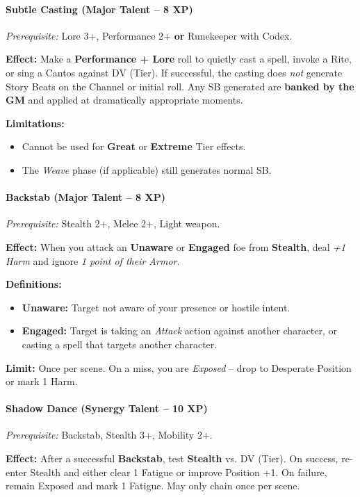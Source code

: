 \paragraph{Subtle Casting (Major Talent -- 8 XP)}
\textit{Prerequisite:} Lore 3+, Performance 2+ \textbf{or} Runekeeper with Codex.

\noindent \textbf{Effect:} Make a \textbf{Performance + Lore} roll to quietly cast a spell, invoke a Rite, or sing a Cantos against DV (Tier). If successful, the casting does \textit{not} generate Story Beats on the Channel or initial roll. Any SB generated are \textbf{banked by the GM} and applied at dramatically appropriate moments.

\noindent \textbf{Limitations:}
\begin{itemize}
    \item Cannot be used for \textbf{Great} or \textbf{Extreme} Tier effects.
    \item The \emph{Weave} phase (if applicable) still generates normal SB.
\end{itemize}

\paragraph{Backstab (Major Talent -- 8 XP)}
\textit{Prerequisite:} Stealth 2+, Melee 2+, Light weapon.

\noindent \textbf{Effect:} When you attack an \textbf{Unaware} or \textbf{Engaged} foe from \textbf{Stealth}, deal \emph{+1 Harm} and ignore \emph{1 point of their Armor}.

\noindent \textbf{Definitions:}
\begin{itemize}
    \item \textbf{Unaware:} Target not aware of your presence or hostile intent.
    \item \textbf{Engaged:} Target is taking an \emph{Attack} action against another character, or casting a spell that targets another character.
\end{itemize}
\noindent \textbf{Limit:} Once per scene. On a miss, you are \emph{Exposed} -- drop to Desperate Position or mark 1 Harm.

\paragraph{Shadow Dance (Synergy Talent -- 10 XP)}
\textit{Prerequisite:} Backstab, Stealth 3+, Mobility 2+.

\noindent \textbf{Effect:} After a successful \textbf{Backstab}, test \textbf{Stealth} vs. DV (Tier). On success, re-enter Stealth and either clear 1 Fatigue or improve Position +1. On failure, remain Exposed and mark 1 Fatigue. May only chain once per scene.

